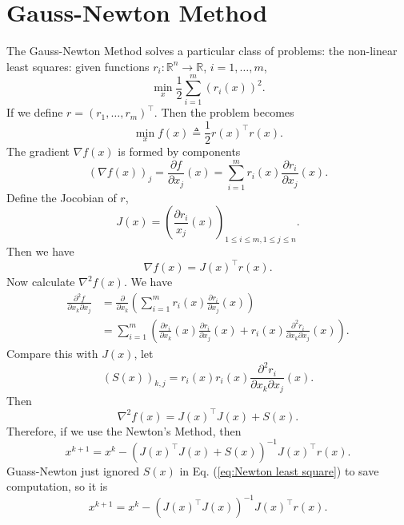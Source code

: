 \documentclass[12pt,a4paper]{report}
\numberwithin{equation}{section}
\theoremstyle{mystyle}
\newcommand{\R}{\mathbb{R}}
\newcommand{\grad}{\nabla}
\newcommand{\T}{\top}
\begin{document}
	\section{Gauss-Newton Method}
	The Gauss-Newton Method solves a particular class of problems: the non-linear least squares: given functions $r_i:\R^n\to \R$, $i=1,\dots,m$,
	\begin{equation}
		\min_x \frac{1}{2} \sum_{i=1}^m (r_i(x))^2.
	\end{equation}
	If we define $r=(r_1,\dots,r_m)^\T$. Then the problem becomes
	\begin{equation}
		\min_x f(x)\triangleq \frac{1}{2} r(x)^\T r(x).
	\end{equation}
	The gradient $\grad f(x)$ is formed by components
	$$
	(\grad f(x))_j = \frac{\partial f}{\partial x_j}(x)=\sum_{i=1}^m r_i(x)\frac{\partial r_i}{\partial x_j}(x).
	$$
	Define the Jocobian of $r$,
	$$
	J(x)=\left(\frac{\partial r_i}{x_j}(x)\right)_{1\leq i\leq m, 1\leq j\leq n}.
	$$
	Then we have 
	\begin{equation}
		\grad f(x)=J(x)^\T r(x).
	\end{equation}
	Now calculate $\grad^2f(x)$. We have
	\begin{equation}
		\begin{split}
			\frac{\partial^2 f}{\partial x_k\partial x_j}
			&=\frac{\partial }{\partial x_k}\left(\sum_{i=1}^m r_i(x)\frac{\partial r_i}{\partial x_j}(x)\right)\\
			&=\sum_{i=1}^m \left(\frac{\partial r_i}{\partial x_k}(x)\frac{\partial r_i}{\partial x_j}(x)+
			r_i(x)\frac{\partial^2 r_i}{\partial x_k\partial x_j}(x)\right).
		\end{split}
	\end{equation}
	Compare this with $J(x)$, let
	$$
	(S(x))_{k,j}=r_i(x)r_i(x)\frac{\partial^2 r_i}{\partial x_k\partial x_j}(x).
	$$
	Then
	\begin{equation}
		\grad^2 f(x)=J(x)^\T J(x)+S(x).
	\end{equation}
	Therefore, if we use the Newton's Method, then
	\begin{equation}\label{eq:Newton least square}
		x^{k+1}=x^k-(J(x)^\T J(x)+S(x))^{-1}J(x)^\T r(x).
	\end{equation}
	Guass-Newton just ignored $S(x)$ in Eq. (\ref{eq:Newton least square}) to save computation, so it is
	\begin{equation}
		x^{k+1}=x^k-(J(x)^\T J(x))^{-1}J(x)^\T r(x).
	\end{equation}
	
\end{document}
